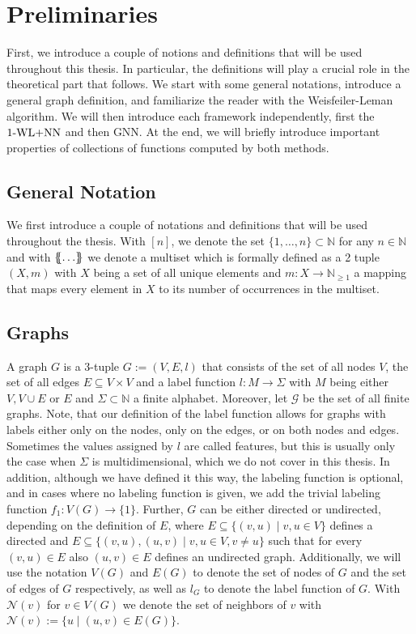 \section{Preliminaries}
First, we introduce a couple of notions and definitions that will be used throughout this thesis. In particular, the definitions will play a crucial role in the theoretical part that follows. We start with some general notations, introduce a general graph definition, and familiarize the reader with the Weisfeiler-Leman algorithm. We will then introduce each framework independently, first the $\text{1-WL+NN}$ and then GNN. At the end, we will briefly introduce important properties of collections of functions computed by both methods.

\subsection{General Notation}
We first introduce a couple of notations and definitions that will be used throughout the thesis. With $[n]$, we denote the set $\{1, \ldots, n\} \subset \mathbb{N}$ for any $n \in \mathbb{N}$ and with $\{\!\!\{ \ldots \}\!\!\}$ we denote a multiset which is formally defined as a 2 tuple $(X, m)$ with $X$ being a set of all unique elements and $m: X \rightarrow \mathbb{N}_{\geq 1}$ a mapping that maps every element in $X$ to its number of occurrences in the multiset.

\subsection{Graphs}
A graph $G$ is a 3-tuple $G:= (V, E, l)$ that consists of the set of all nodes $V$, the set of all edges $E \subseteq V \times V$ and a label function $l: M \rightarrow \Sigma$ with $M$ being either $V, V \cup E$ or $E$ and $\Sigma \subset \mathbb{N}$ a finite alphabet. Moreover, let $\mathcal{G}$ be the set of all finite graphs. Note, that our definition of the label function allows for graphs with labels either only on the nodes, only on the edges, or on both nodes and edges. Sometimes the values assigned by $l$ are called features, but this is usually only the case when $\Sigma$ is multidimensional, which we do not cover in this thesis. In addition, although we have defined it this way, the labeling function is optional, and in cases where no labeling function is given, we add the trivial labeling function $f_1: V(G) \rightarrow \{1\}$. Further, $G$ can be either directed or undirected, depending on the definition of $E$, where $E \subseteq \{(v,u) \mid v,u \in V\}$ defines a directed and $E \subseteq \{(v, u), (u,v) \mid v,u \in V, v\neq u\}$ such that for every $(v,u) \in E$ also $(u,v) \in E$ defines an undirected graph. Additionally, we will use the notation $V(G)$ and $E(G)$ to denote the set of nodes of $G$ and the set of edges of $G$ respectively, as well as $l_G$ to denote the label function of $G$. With $\mathcal{N}(v)$ for $v \in V(G)$ we denote the set of neighbors of $v$ with $\mathcal{N}(v) := \{u \mid (u, v) \in E(G)\}$.

